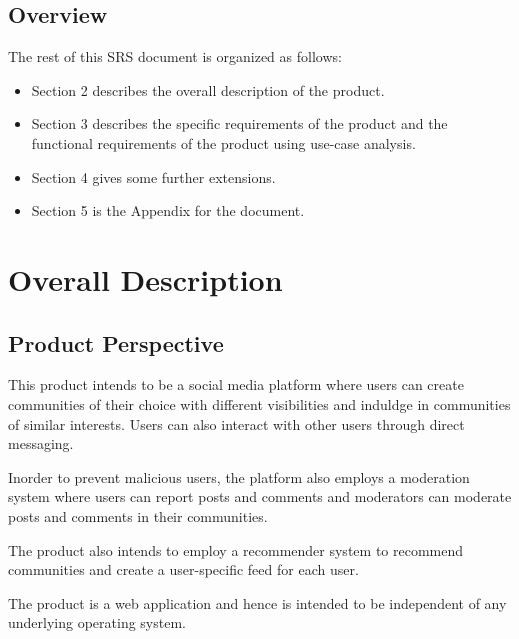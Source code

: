 \documentclass[conference,compsoc]{IEEEtran}
\begin{document}
\subsection{Overview}
The rest of this SRS document is organized as follows:
\begin{itemize}
    \item Section 2 describes the overall description of the product.
    \item Section 3 describes the specific requirements of the product and the functional requirements of the product using use-case analysis.
    \item Section 4 gives some further extensions.
    \item Section 5 is the Appendix for the document.
\end{itemize}
\section{Overall Description}
\subsection{Product Perspective}
This product intends to be a social media platform where users can create communities of their choice with different visibilities and induldge in communities of similar interests. Users can also interact with other users through direct messaging.

Inorder to prevent malicious users, the platform also employs a moderation system where users can report posts and comments and moderators can moderate posts and comments in their communities.

The product also intends to employ a recommender system to recommend communities and create a user-specific feed for each user.

The product is a web application and hence is intended to be independent of any underlying operating system.
\end{document}
